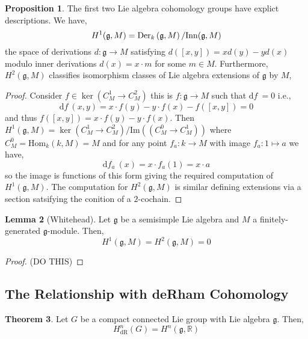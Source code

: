 \documentclass[12pt]{extarticle}
\newcommand{\Hom}[3]{\mathrm{Hom}_{#1}\left( #2, #3 \right)}
\newcommand{\R}{\mathbb{R}}
\renewcommand{\Im}[1]{\mathrm{Im}(#1)}
\renewcommand{\d}[1]{ \mathrm{d}#1 \:}
\theoremstyle{definition}
\newtheorem{theorem}{Theorem}[section]
\newtheorem{lemma}[theorem]{Lemma}
\newtheorem{proposition}[theorem]{Proposition}
\newcommand{\g}{\mathfrak{g}}
\newcommand{\h}{\mathfrak{h}}
\begin{document}
\newcommand{\Inn}{\mathrm{Inn}}

\begin{proposition}
The first two Lie algebra cohomology groups have explict descriptions. We have, 
\[ H^1(\g, M) = \Der{k}{\g}{M} / \Inn(\g, M) \]
the space of derivations $d : \g \to M$ satisfying $d([x, y]) = x d(y) - y d(x)$ modulo inner derivations $d(x) = x \cdot m$ for some $m \in M$. Furthermore, $H^2(\g, M)$ classifies isomorphism classes of Lie algebra extensions of $\g$ by $M$,
\begin{center}
\end{center}
\end{proposition}

\begin{proof}
Consider $f \in \ker{(C^1_M \to C^2_M)}$ this is $f : \g \to M$ such that $\d{f} = 0$ i.e.,
\[ \d{f}(x, y) = x \cdot f(y) - y \cdot f(x) - f([x, y]) = 0 \]
and thus $f([x,y]) = x \cdot f(y) - y \cdot f(x)$. Then $H^1(\g, M) = \ker{(C^1_M \to C^2_M)} / \Im{(C^0_M \to C^1_M)}$ where $C^0_M = \Hom{k}{k}{M} = M$ and for any point $f_a : k \to M$ with image $f_a : 1 \mapsto a$ we have,
\[ \d{f_a}(x) = x \cdot f_a(1) = x \cdot a \]
so the image is functions of this form giving the required computation of $H^1(\g, M)$. The computation for $H^2(\g, M)$ is similar defining extensions via a section satsifying the conition of a $2$-cochain. 
\end{proof}

\begin{lemma}[Whitehead]
Let $\g$ be a semisimple Lie algebra and $M$ a finitely-generated $\g$-module. Then,
\[ H^1(\g, M) = H^2(\g, M) = 0 \]
\end{lemma}


\begin{proof}
(DO THIS)
\end{proof}



\subsection{The Relationship with deRham Cohomology}


\begin{theorem}
Let $G$ be a compact connected Lie group with Lie algebra $\g$. Then,
\[ H^n_{\text{dR}}(G) = H^n(\g, \R) \]
\end{theorem}
\end{document}
